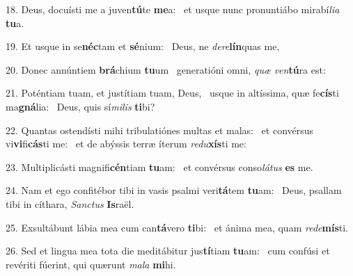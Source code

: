18. Deus, docuísti me a juven\textbf{tú}te \textbf{me}a: \ast\  et usque nunc pronuntiábo mirabí\textit{li}\textit{a} \textbf{tu}a.\

19. Et usque in se\textbf{néc}tam et \textbf{sé}nium: \ast\  Deus, ne \textit{de}\textit{re}\textbf{lín}quas me,\

20. Donec annúntiem \textbf{brá}chium \textbf{tu}um \ast\  generatióni omni, \textit{quæ} \textit{ven}\textbf{tú}ra est:\

21. Poténtiam tuam, et justítiam tuam, Deus, \dag\  usque in altíssima, quæ fe\textbf{cís}ti ma\textbf{gná}lia: \ast\  Deus, quis sí\textit{mi}\textit{lis} \textbf{ti}bi?\

22. Quantas ostendísti mihi tribulatiónes multas et malas: \dag\  et convérsus vi\textbf{vi}fi\textbf{cás}ti me: \ast\  et de abýssis terræ íterum \textit{re}\textit{du}\textbf{xís}ti me:\

23. Multiplicásti magnifi\textbf{cén}tiam \textbf{tu}am: \ast\  et convérsus conso\textit{lá}\textit{tus} \textbf{es} me.\

24. Nam et ego confitébor tibi in vasis psalmi veri\textbf{tá}tem \textbf{tu}am: \ast\  Deus, psallam tibi in cíthara, \textit{Sanc}\textit{tus} \textbf{Is}raël.\

25. Exsultábunt lábia mea cum can\textbf{tá}vero \textbf{ti}bi: \ast\  et ánima mea, quam \textit{red}\textit{e}\textbf{mís}ti.\

26. Sed et lingua mea tota die meditábitur jus\textbf{tí}tiam \textbf{tu}am: \ast\  cum confúsi et revériti fúerint, qui quærunt \textit{ma}\textit{la} \textbf{mi}hi.\

